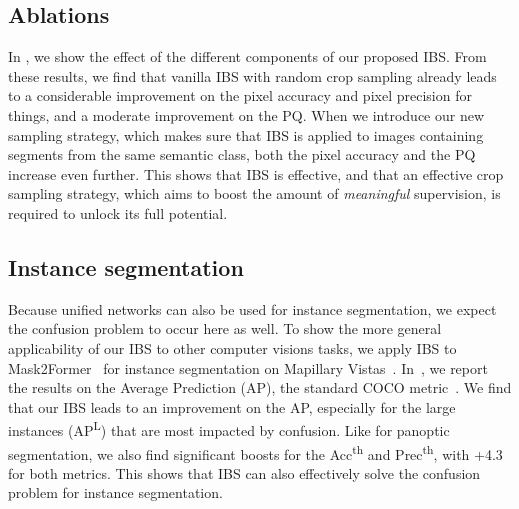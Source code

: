 \documentclass[10pt,twocolumn,letterpaper]{article}
\begin{document}
\subsection{Ablations}
In , we show the effect of the different components of our proposed IBS. From these results, we find that vanilla IBS with random crop sampling already leads to a considerable improvement on the pixel accuracy and pixel precision for things, and a moderate improvement on the PQ. When we introduce our new sampling strategy, which makes sure that IBS is applied to images containing segments from the same semantic class, both the pixel accuracy and the PQ increase even further. This shows that IBS is effective, and that an effective crop sampling strategy, which aims to boost the amount of \textit{meaningful} supervision, is required to unlock its full potential. 





\subsection{Instance segmentation}
Because unified networks can also be used for instance segmentation, we expect the confusion problem to occur here as well. To show the more general applicability of our IBS to other computer visions tasks, we apply IBS to Mask2Former~\cite{cheng2021mask2former} for instance segmentation on Mapillary Vistas~\cite{neuhold2017mapillary}. In~, we report the results on the Average Prediction (AP), the standard COCO metric~\cite{lin2014coco}.
We find that our IBS leads to an improvement on the AP, especially for the large instances (AP\textsuperscript{L}) that are most impacted by confusion. Like for panoptic segmentation, we also find significant boosts for the Acc\textsuperscript{th} and Prec\textsuperscript{th}, with +4.3 for both metrics. This shows that IBS can also effectively solve the confusion problem for instance segmentation.
\end{document}
